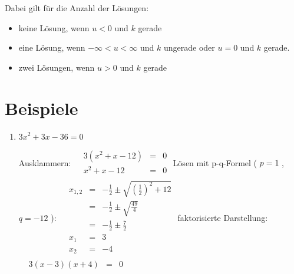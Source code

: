 		Dabei gilt für die Anzahl der Lösungen:
		\begin{itemize}
			\item keine Lösung, wenn $ u < 0 $ und $k$ gerade
			\item eine Lösung, wenn $ -\infty < u < \infty $ und $k$ ungerade oder $ u = 0 $ und $k$ gerade.
			\item zwei Lösungen, wenn $ u > 0 $ und $k$ gerade
		\end{itemize}
		
	\section{Beispiele}
\begin{enumerate}
    \item $3x^2  + 3x - 36 = 0$
        
        Ausklammern: \newline
        $\begin{array}{crcl}
            &3(x^2 + x - 12) &=& 0 \\
            &x^2 + x - 12 &=& 0 \\
        \end{array}$ \newline\newline
        Lösen mit p-q-Formel ( $ p = 1 $ , $ q = -12 $ ):\newline
        $\begin{array}{crcl}
         &x_{1,2} &=& - \frac 1 2 \pm \sqrt{\left(\frac 1 2 \right)^2 + 12} \\
        &&=& - \frac 1 2 \pm \sqrt {\frac {49} 4}  \\
        &&=& - \frac 1 2 \pm \frac 7 2 \\
        &x_1 &=& 3 \\
        &x_2 &=& -4 \\
        \end{array}$ \newline\newline
        faktorisierte Darstellung: \newline
        $\begin{array}{crcl}
         &3 (x - 3) (x + 4) &=& 0\\
        \end{array}$
\end{enumerate}

